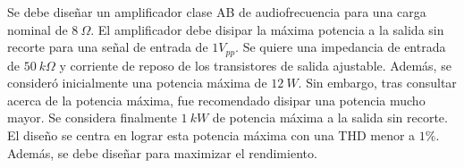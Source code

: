 



Se debe diseñar un amplificador clase AB de audiofrecuencia para una carga nominal de $8 \ \Omega$. El amplificador debe disipar la máxima potencia a la salida sin recorte para una señal de entrada de $1 V_{pp}$. Se quiere una impedancia de entrada de $50 \ k\Omega$ y corriente de reposo de los transistores de salida ajustable. Además, se consideró inicialmente una potencia máxima de $12 \ W$. Sin embargo, tras consultar acerca de la potencia máxima, fue recomendado disipar una potencia mucho mayor. Se considera finalmente $1 \ kW$ de potencia máxima a la salida sin recorte. El diseño se centra en lograr esta potencia máxima con una THD menor a $1\%$. Además, se debe diseñar para maximizar el rendimiento.
 
